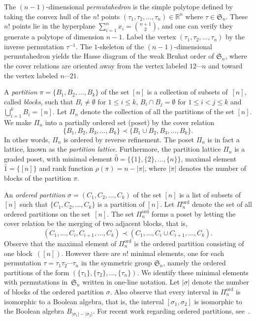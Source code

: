 \documentclass[10pt]{amsart}
\theoremstyle{definition}
\newcommand{\Rrr}{\mathbb{R}}
\newcommand{\Sym}{\mathfrak{S}}
\DeclareMathOperator{\ord}{ord}
\newcommand{\hz}{\hat{0}}
\newcommand{\ho}{\hat{1}}
\newcommand{\coveredby}{\prec}
\newcommand{\Qn}{\Pi^{\ord}_{n}}
\begin{document}
The $(n-1)$-dimensional
\emph{permutahedron} 
is the simple polytope defined by
taking the convex hull of the $n!$ points 
$(\tau_{1}, \tau_{2}, \ldots, \tau_{n}) \in \Rrr^{n}$
where $\tau \in \Sym_{n}$.
These $n!$ points lie in the hyperplane
$\sum_{i=1}^{n} x_{i} = \binom{n+1}{2}$,
and one can verify
they generate a
polytope of dimension $n-1$.
Label the vertex
$(\tau_{1}, \tau_{2}, \ldots, \tau_{n})$ by the inverse permutation $\tau^{-1}$.
The $1$-skeleton of the $(n-1)$-dimensional permutahedron
yields the Hasse diagram of the weak Bruhat order of $\Sym_{n}$,
where the cover relations are oriented away from
the vertex labeled $12 \cdots n$ and toward the vertex labeled $n \cdots 21$.




A \emph{partition} $\pi = \{B_{1}, B_{2}, \ldots, B_{k}\}$
of the set $[n]$ is a collection of subsets of~$[n]$, called \emph{blocks},
such that $B_{i} \neq \emptyset$ for $1 \leq i \leq k$,
$B_{i} \cap B_{j} = \emptyset$ for $1 \leq i < j \leq k$
and
$\bigcup_{i=1}^{k} B_{i} = [n]$.
Let $\Pi_{n}$ denote
the collection of all the partitions of the set $[n]$.
We make $\Pi_{n}$ into a partially ordered set (poset)
by the cover relation
$$
  \{B_{1}, B_{2}, B_{3}, \ldots, B_{k}\}
  \coveredby
  \{B_{1} \cup B_{2}, B_{3}, \ldots, B_{k}\} .
$$
In other words, $\Pi_{n}$ is ordered by reverse refinement.
The poset $\Pi_{n}$ is in fact a lattice,
known as the \emph{partition lattice}.
Furthermore, the partition lattice $\Pi_{n}$ is a graded poset,
with minimal element
$\hz = \{\{1\}, \{2\}, \ldots, \{n\}\}$,
maximal element
$\ho = \{[n]\}$
and rank function
$\rho(\pi) = n-|\pi|$,
where
$|\pi|$ denotes the number of blocks of the partition $\pi$.



An \emph{ordered partition} 
$\sigma = (C_{1}, C_{2}, \ldots, C_{k})$
of the set $[n]$
is a list of subsets of $[n]$ such that
$\{C_{1}, C_{2}, \ldots, C_{k}\}$
is a partition of $[n]$.
Let $\Qn$ denote the set of all
ordered partitions on the set~$[n]$.
The set $\Qn$ forms a poset
by letting the cover relation
be the merging of two adjacent blocks, that is,
$$
(C_{1}, \ldots, C_{i}, C_{i+1}, \ldots, C_{k})
\coveredby
(C_{1}, \ldots, C_{i} \cup C_{i+1}, \ldots, C_{k}) .
$$
Observe that the maximal element of
$\Qn$ is
the ordered partition consisting of one block~$([n])$.
However there are $n!$ minimal elements,
one for each permutation $\tau = \tau_{1} \tau_{2} \cdots \tau_{n}$
in the symmetric group $\Sym_{n}$, namely
the ordered partitions of the form
$(\{\tau_{1}\}, \{\tau_{2}\}, \ldots, \{\tau_{n}\})$.
We identify these minimal elements with
permutations in~$\Sym_{n}$ written in one-line notation.
Let $|\sigma|$ denote the number of blocks of the ordered partition $\sigma$.
Also observe that every interval in $\Qn$ is isomorphic
to a Boolean algebra,
that is,
the interval $[\sigma_{1},\sigma_{2}]$
is isomorphic to the Boolean algebra $B_{|\sigma_{1}| - |\sigma_{2}|}$.
For recent work regarding ordered partitions, 
see~\cite{Ehrenborg_Hedmark,Ehrenborg_Jung}.
\end{document}

